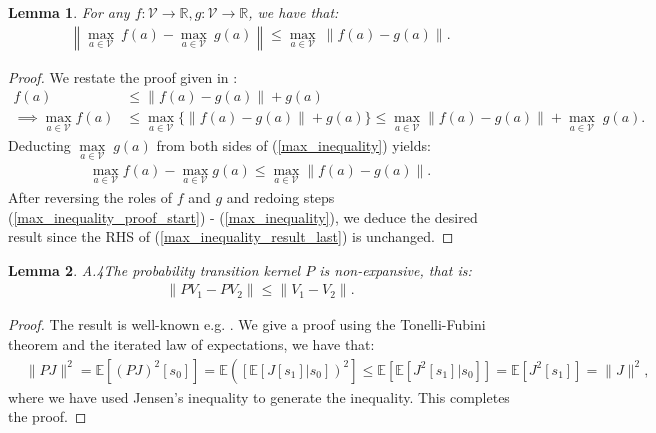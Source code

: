 \documentclass{article}
\newtheorem{lemma}{Lemma}
\begin{document}
\begin{lemma} \label{max_lemma}
For any
$f: \mathcal{V}\to\mathbb{R},g: \mathcal{V}\to\mathbb{R}$, we have that:
\begin{align}
\left\|\underset{a\in \mathcal{V}}{\max}\:f(a)-\underset{a\in \mathcal{V}}{\max}\: g(a)\right\| \leq \underset{a\in \mathcal{V}}{\max}\: \left\|f(a)-g(a)\right\|.    \label{lemma_1_basic_max_ineq}
\end{align}
\end{lemma}
\begin{proof}
We restate the proof given in \cite{mguni2019cutting}:
\begin{align}
f(a)&\leq \left\|f(a)-g(a)\right\|+g(a)\label{max_inequality_proof_start}
\\\implies
\underset{a\in \mathcal{V}}{\max}f(a)&\leq \underset{a\in \mathcal{V}}{\max}\{\left\|f(a)-g(a)\right\|+g(a)\}
\leq \underset{a\in \mathcal{V}}{\max}\left\|f(a)-g(a)\right\|+\underset{a\in \mathcal{V}}{\max}\;g(a). \label{max_inequality}
\end{align}
Deducting $\underset{a\in \mathcal{V}}{\max}\;g(a)$ from both sides of (\ref{max_inequality}) yields:
\begin{align}
    \underset{a\in \mathcal{V}}{\max}f(a)-\underset{a\in \mathcal{V}}{\max}g(a)\leq \underset{a\in \mathcal{V}}{\max}\left\|f(a)-g(a)\right\|.\label{max_inequality_result_last}
\end{align}
After reversing the roles of $f$ and $g$ and redoing steps (\ref{max_inequality_proof_start}) - (\ref{max_inequality}), we deduce the desired result since the RHS of (\ref{max_inequality_result_last}) is unchanged.
\end{proof}

\begin{lemma}{A.4}\label{non_expansive_P}
The probability transition kernel $P$ is non-expansive, that is:
\begin{align}
    \|PV_1-PV_2\|\leq \|V_1-V_2\|.
\end{align}
\end{lemma} 
\begin{proof}
The result is well-known e.g. \cite{tsitsiklis1999optimal}. We give a proof using the Tonelli-Fubini theorem and the iterated law of expectations, we have that:
\begin{align*}
&\|PJ\|^2=\mathbb{E}\left[(PJ)^2[s_0]\right]=\mathbb{E}\left(\left[\mathbb{E}\left[J[s_1]|s_0\right]\right)^2\right]
\leq \mathbb{E}\left[\mathbb{E}\left[J^2[s_1]|s_0\right]\right] 
= \mathbb{E}\left[J^2[s_1]\right]=\|J\|^2,
\end{align*}
where we have used Jensen's inequality to generate the inequality. This completes the proof.
\end{proof}
\end{document}
